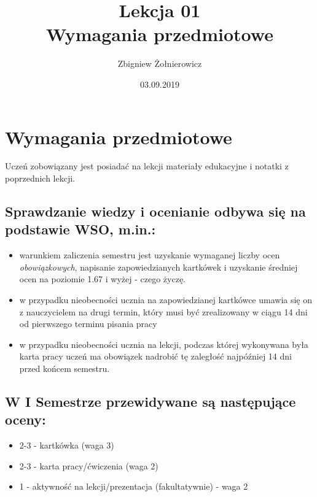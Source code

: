 \documentclass{article}
\begin{document}
\title{{\huge Lekcja 01} \\
{\large Wymagania przedmiotowe}}
\author{Zbigniew Żołnierowicz}
\date{03.09.2019}
\maketitle
\section{Wymagania przedmiotowe}
Uczeń zobowiązany jest posiadać na lekcji materiały edukacyjne i notatki z poprzednich lekcji.
\subsection{Sprawdzanie wiedzy i ocenianie odbywa się na podstawie WSO, m.in.:}
    \begin{itemize}
        \item warunkiem zaliczenia semestru jest uzyskanie wymaganej liczby ocen \emph{obowiązkowych},
        napisanie zapowiedzianych kartkówek i uzyskanie średniej ocen na poziomie 1.67 i wyżej - czego życzę.
        \item w przypadku nieobecności ucznia na zapowiedzianej kartkówce umawia się on z nauczycielem na drugi termin,
        który musi być zrealizowany w ciągu 14 dni od pierwszego terminu pisania pracy
        \item w przypadku nieobecności ucznia na lekcji, podczas której wykonywana była karta pracy uczeń ma obowiązek
        nadrobić tę zaległość najpóźniej 14 dni przed końcem semestru.
    \end{itemize}
\subsection{W I Semestrze przewidywane są następujące oceny:}
    \begin{itemize}
        \item 2-3 - kartkówka (waga 3)
        \item 2-3 - karta pracy/ćwiczenia (waga 2)
        \item 1 - aktywność na lekcji/prezentacja (fakultatywnie) - waga 2
    \end{itemize}
\end{document}
